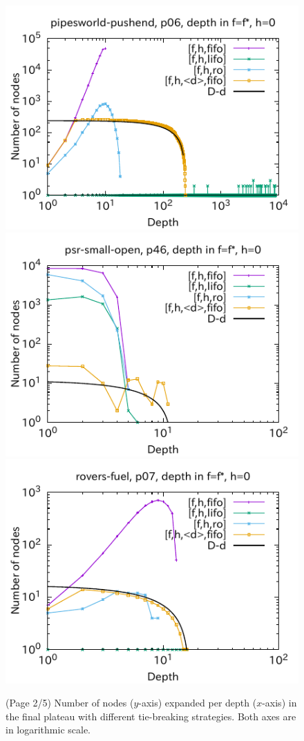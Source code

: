 \begin{figure}[htbp]
\includegraphics{img/output-lmcut/pipesworld-pushend/p06-0.pdf}
\includegraphics{img/output-lmcut/psr-small-open/p46-0.pdf}
\includegraphics{img/output-lmcut/rovers-fuel/p07-0.pdf}
 \caption{(Page 2/5) Number of nodes ($y$-axis) expanded per depth ($x$-axis) in
 the final plateau with different tie-breaking strategies. Both axes are in logarithmic scale.
 }
 \label{fig:depth-histogram2}
\end{figure}

